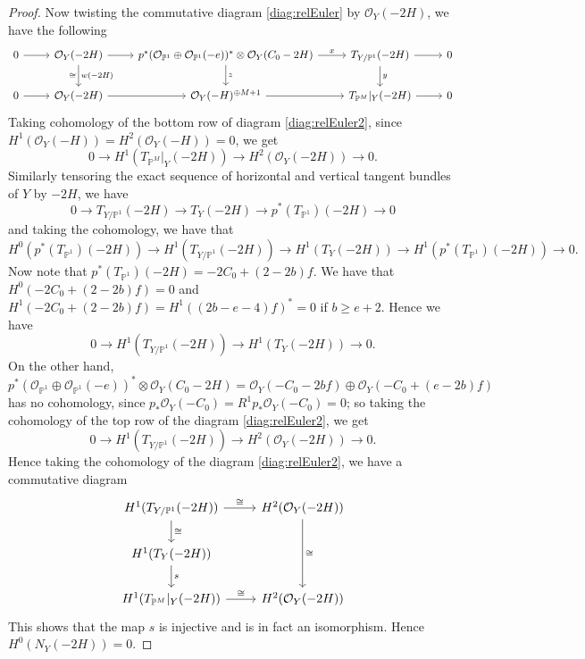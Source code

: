 \documentclass[11pt,twoside]{amsart}
\theoremstyle{plain}
\theoremstyle{definition}
\newcommand{\PP}{\mathbb{P}}
\newcommand{\PM}{\mathbb{P}^M}
\newcommand{\OO}{\mathcal{O}}
\newcommand{\NY}{N_{Y}}
\newcommand{\TP}{T_{\PM}|_Y}
\begin{document}
\begin{proof}
Now twisting the commutative diagram \eqref{diag:relEuler} by $\OO_Y(-2H)$, we have the following
\begin{equation}\label{diag:relEuler2}
\begin{tikzcd}
  0 \arrow[r] & \OO_Y(-2H) \arrow[r] \arrow[d, "w(-2H)", "\cong"'] & p^*(\OO_{\PP^1} \oplus \OO_{\PP^1}(-e))^* \otimes \OO_Y(C_0-2H) \arrow[r, "x"] \arrow[d, "z"] & T_{Y/\PP^1}(-2H) \arrow[r] \arrow[d, "y"] & 0 \\
   0 \arrow[r] & \OO_Y(-2H) \arrow[r] & \OO_Y(-H)^{\oplus M+1} \arrow[r] & \TP(-2H) \arrow[r] & 0
\end{tikzcd}
\end{equation}
Taking cohomology of the bottom row of diagram \eqref{diag:relEuler2}, since $H^1(\OO_Y(-H))=H^2(\OO_Y(-H))=0$, we get
\[
0\to H^1(\TP(-2H))\to H^2(\OO_Y(-2H))\to0 .
\]
Similarly tensoring the exact sequence of horizontal and vertical tangent bundles of $Y$ by $-2H$, we have
\[
0\to T_{Y/\PP^1}(-2H)\to T_Y(-2H)\to p^*(T_{\PP^1})(-2H)\to0
\]
and taking the cohomology, we have that
\[
H^0(p^*(T_{\PP^1})(-2H))\to H^1(T_{Y/\PP^1}(-2H))\to H^1(T_Y(-2H))\to H^1(p^*(T_{\PP^1})(-2H))\to0 .
\]
Now note that $p^*(T_{\PP^1})(-2H)=-2C_0+(2-2b)f$. We have that $H^0(-2C_0+(2-2b)f)=0$ and $H^1(-2C_0+(2-2b)f)=H^1((2b-e-4)f)^*=0$ if $b\ge e+2$. Hence we have
\[
0\to H^1(T_{Y/\PP^1}(-2H))\to H^1(T_Y(-2H))\to0 .
\]
On the other hand, $p^*(\OO_{\PP^1}\oplus\OO_{\PP^1}(-e))^*\otimes\OO_Y(C_0-2H)=\OO_Y(-C_0-2bf)\oplus\OO_Y(-C_0+(e-2b)f)$ has no cohomology, since $p_*\OO_Y(-C_0)=R^1p_*\OO_Y(-C_0)=0$; so taking the cohomology of the top row of the diagram \eqref{diag:relEuler2}, we get
\[
0\to H^1(T_{Y/\PP^1}(-2H))\to H^2(\OO_Y(-2H))\to0 .
\]
Hence taking the cohomology of the diagram \eqref{diag:relEuler2}, we have a commutative diagram
\[
\begin{tikzcd}
    H^1(T_{Y/\PP^1}(-2H)) \arrow[d, "\cong"] \arrow[r, "\cong"] & H^2(\OO_Y(-2H)) \arrow[dd, "\cong"] \\
     H^1(T_{Y}(-2H)) \arrow[d, "s"] & \\
     H^1(\TP(-2H)) \arrow[r, "\cong"] & H^2(\OO_Y(-2H))
\end{tikzcd}
\]
This shows that the map $s$ is injective and is in fact an isomorphism. Hence $H^0(\NY(-2H))=0$.
\smallskip


\end{proof}
\end{document}
